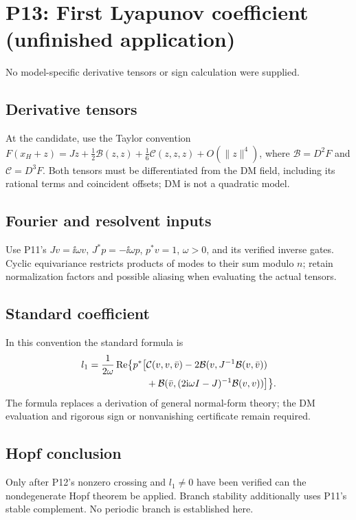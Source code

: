 \section{P13: First Lyapunov coefficient (unfinished application)}
\label{sec:P13}
No model-specific derivative tensors or sign calculation were supplied.
\subsection{Derivative tensors}\label{slot:P13-1}
At the candidate, use the Taylor convention
$F(x_H+z)=Jz+\frac12\mathcal B(z,z)+\frac16\mathcal C(z,z,z)+O(\|z\|^4)$,
where $\mathcal B=D^2F$ and $\mathcal C=D^3F$.
Both tensors must be differentiated from the DM field, including its
rational terms and coincident offsets; DM is not a quadratic model.
\subsection{Fourier and resolvent inputs}\label{slot:P13-2}
Use P11's $Jv=\ii\omega v$, $J^*p=-\ii\omega p$, $p^*v=1$,
$\omega>0$, and its verified inverse gates. Cyclic equivariance restricts
products of modes to their sum modulo $n$; retain normalization factors
and possible aliasing when evaluating the actual tensors.
\subsection{Standard coefficient}\label{slot:P13-3}
In this convention the standard formula is \cite{KuznetsovHopf2006}
\begin{align*}
 l_1=\frac1{2\omega}\operatorname{Re}\bigl\{p^*\bigl[
 &\mathcal C(v,v,\bar v)-2\mathcal B(v,J^{-1}\mathcal B(v,\bar v))\\
 &+\mathcal B(\bar v,(2\mathrm{i}\omega I-J)^{-1}\mathcal B(v,v))\bigr]\bigr\}.
\end{align*}
The formula replaces a derivation of general normal-form theory; the DM
evaluation and rigorous sign or nonvanishing certificate remain required.
\subsection{Hopf conclusion}\label{slot:P13-4}
Only after P12's nonzero crossing and $l_1\ne0$ have been verified can
the nondegenerate Hopf theorem be applied. Branch stability additionally
uses P11's stable complement. No periodic branch is established here.
